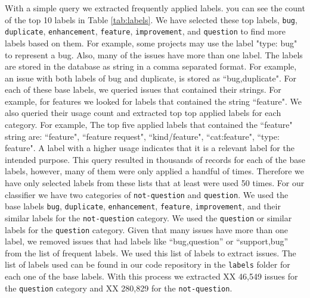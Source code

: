 \documentclass[conference]{IEEEtran}
\begin{document}
With a simple query we extracted frequently applied labels. you 
can see the count of the top 10 labels in Table \ref{tab:labels}. 
We have selected these top labels, \verb|bug|, \verb|duplicate|, \verb|enhancement|,
\verb|feature|, \verb|improvement|, and \verb|question| to find more labels based on them.
For example, some projects may use the label "type: bug" to represent a bug. Also, many of the issues 
have more than one label. The labels are stored in the database as string in a comma separated format. 
For example, an issue with both labels of bug and duplicate, is stored as ``bug,duplicate". 
For each of these base labels, we queried issues that contained their strings. For example,
for features we looked for labels that contained the string ``feature". We also queried their usage count and
extracted top top applied labels for each category.
For example, The top five applied labels that contained the ``feature" string 
are: ``feature", ``feature request", ``kind/feature", ``cat:feature", ``type: feature".
A label with a higher usage indicates that it is a relevant label for the intended purpose. This query resulted
in thousands of records for each of the base labels, however, many of them were only applied
a handful of times. Therefore we have only selected labels from these lists that 
at least were used 50 times. For our classifier we have two categories of \verb|not-question| 
and \verb|question|. We used the base labels \verb|bug|, \verb|duplicate|, \verb|enhancement|,
\verb|feature|, \verb|improvement|, and their similar labels for the \verb|not-question| category. We used
the \verb|question| or similar labels for the \verb|question| category. Given that many issues have 
more than one label, we removed issues that had labels like ``bug,question'' or ``support,bug'' from 
the list of frequent labels. We used this list of labels to extract issues. The list of labels
used can be found in our code repository in the \verb|labels| folder for each one of the base labels.
With this process we extracted XX 46,549 issues for the \verb|question| category and XX 280,829 for 
the \verb|not-question|.
\end{document}
